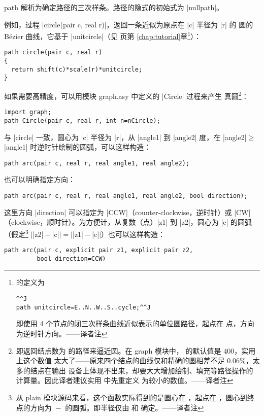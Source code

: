 \documentclass[nofonts,CJKnormalspaces]{ctexbook}[2009/05/20]
\makeatletter
\let\geq\geqslant
\newenvironment{typelist}{\itemize
  \let\old@item\@item
  \def\@item[##1]{\expandafter\old@item[\ttfamily\color{type!50!black}##1]}}
{\enditemize}
\newcommand*\prgname[1]{\textsf{#1}}
\newcommand\transnote[1]{\footnote{#1——译者注}}
\makeatother
\begin{document}
\begin{typelist}
\item[path] 解析为确定路径的三次样条。路径的隐式的初始式为 |nullpath|。

例如，过程 |circle(pair c, real r)|，返回一条近似为原点在 |c| 半径为 |r| 的
圆的 Bézier 曲线，它基于 |unitcircle|（见 \pageref{chap:tutorial} 页第%
\ref{chap:tutorial}章\transnote{ 的定义为
\begin{lstlisting}^^J
path unitcircle=E..N..W..S..cycle;^^J
\end{lstlisting}
即使用 4 个节点的闭三次样条曲线近似表示的单位圆路径，起点在
\inlinecode{(1,0)} 点，方向为逆时针方向。}）：
\begin{lstlisting}
path circle(pair c, real r)
{
  return shift(c)*scale(r)*unitcircle;
}
\end{lstlisting}
如果需要高精度，可以用模块 \prgname{graph.asy} 中定义的 |Circle| 过程来产生
真圆\transnote{即返回结点数为  的路径来逼近圆。在
\prgname{graph} 模块中，\inlinecode{nCircle} 的默认值是 $400$，实用上这个数值
太大了——原来四个结点的曲线仅和精确的圆相差不足 $0.06\%$，太多的结点在输出
设备上体现不出来，却要大大增加绘制、填充等路径操作的计算量。因此译者建议实用
中先重定义 \inlinecode{nCircle} 为较小的数值。}：
\begin{lstlisting}
import graph;
path Circle(pair c, real r, int n=nCircle);
\end{lstlisting}

与 |circle| 一致，圆心为 |c| 半径为 |r|，从 |angle1| 到 |angle2| 度，在
|angle2|${}\geq{}$|angle1| 时逆时针绘制的圆弧，可以这样构造：
\begin{lstlisting}
path arc(pair c, real r, real angle1, real angle2);
\end{lstlisting}

也可以明确指定方向：
\begin{lstlisting}
path arc(pair c, real r, real angle1, real angle2, bool direction);
\end{lstlisting}
这里方向 |direction| 可以指定为 |CCW|（counter-clockwise，逆时针）或 |CW|%
（clockwise，顺时针）。为方便计，从复数（点）|z1| 到 |z2|，圆心为 |c| 的圆弧
（假定\transnote{从 \prgname{plain} 模块源码来看，这个函数实际得到的是圆心在
，起点在 \inlinecode{z1}，圆心到终点的方向为
\inlinecode{z2}${}-{}$\inlinecode{c} 的圆弧。即半径仅由 \inlinecode{c} 和
\inlinecode{z1} 确定。}
$\vert$|z2|${}-{}$|c|$\vert=\vert$|z1|${}-{}$|c|$\vert$）也可以这样构造：
\begin{lstlisting}
path arc(pair c, explicit pair z1, explicit pair z2,
         bool direction=CCW)
\end{lstlisting}


\end{typelist}
\end{document}

